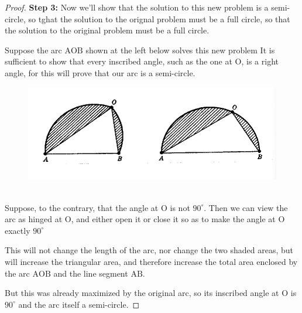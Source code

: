 \documentclass[a4paper]{book}
\numberwithin{theorem}{section}%
\begin{document}
\begin{proof}
    \textbf{Step 3:} Now we'll show that the solution to this new problem is a semi-circle, so tghat the solution to the orignal problem must be a full circle, so that the solution to the original problem must be a full circle.

    Suppose the arc $\mathrm{AOB}$ shown at the left below solves this new problem It is sufficient to show that every inscribed angle, such as the one at $\mathrm{O}$, is a right angle, for this will prove that our arc is a semi-circle.
    \begin{figure}[hbt!]
        \begin{center}   
            \includegraphics[width=130mm]{steiner3}
            \caption{}
        \end{center}
    \end{figure}\leavevmode\\
    Suppose, to the contrary, that the angle at $\mathrm{O}$ is not $90^{\circ}$. Then we can view the arc as hinged at $\mathrm{O}$, and either open it or close it so as to make the angle at $\mathrm{O}$ exactly $90^{\circ}$

    This will not change the length of the arc, nor change the two shaded areas, but will increase the triangular area, and therefore increase the total area enclosed by the arc $\mathrm{AOB}$ and the line segment $\mathrm{AB}$.

    But this was already maximized by the original arc, so its inscribed angle at $\mathrm{O}$ is $90^{\circ}$ and the arc itself a semi-circle.


\end{proof}
\end{document}
